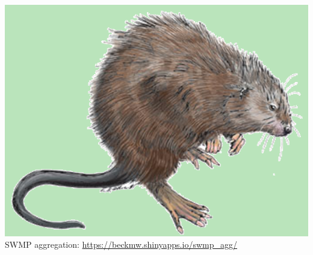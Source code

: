 \documentclass[serif]{beamer}\usepackage[]{graphicx}\usepackage[]{color}
\begin{document}
\begin{frame}[t, fragile]{\includegraphics[width=0.05\paperwidth]{fig/muskrat.png}\hspace{0.07in}{\bf SWMPrats.net: Widgets}}
SWMP aggregation: \href{https://beckmw.shinyapps.io/swmp_agg/}{https://beckmw.shinyapps.io/swmp\_agg/}\\~\\
\centerline{}
\end{frame}
\end{document}
